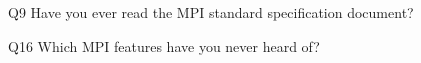 \begin{description}%
\item{Q9} Have you ever read the MPI standard specification document?%
\item{Q16} Which MPI features have you never heard of?%
\end{description}%
